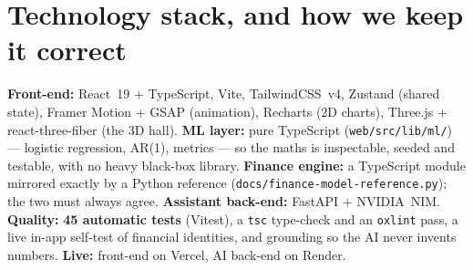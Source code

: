 \documentclass[11pt,a4paper]{article}
\begin{document}
\section{Technology stack, and how we keep it correct}
\textbf{Front-end:} React~19 + TypeScript, Vite, TailwindCSS~v4, Zustand (shared state), Framer
Motion + GSAP (animation), Recharts (2D charts), Three.js + react-three-fiber (the 3D hall). \textbf{ML
layer:} pure TypeScript (\texttt{web/src/lib/ml/}) --- logistic regression, AR(1), metrics --- so the
maths is inspectable, seeded and testable, with no heavy black-box library. \textbf{Finance engine:}
a TypeScript module mirrored exactly by a Python reference (\texttt{docs/finance-model-reference.py});
the two must always agree. \textbf{Assistant back-end:} FastAPI + NVIDIA~NIM. \textbf{Quality:}
\textbf{45 automatic tests} (Vitest), a \texttt{tsc} type-check and an \texttt{oxlint} pass, a live
in-app self-test of financial identities, and grounding so the AI never invents numbers.
\textbf{Live:} front-end on Vercel, AI back-end on Render.

\end{document}

